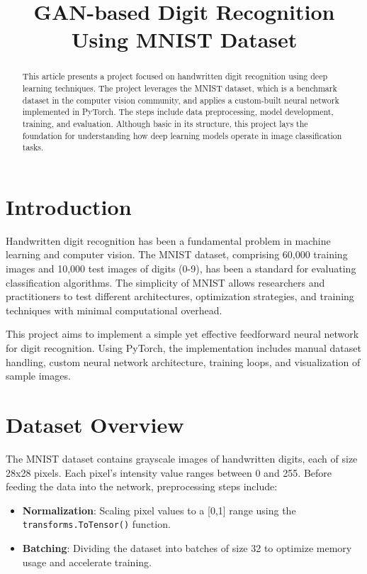 \documentclass{article}
\title{GAN-based Digit Recognition Using MNIST Dataset}
\author{}
\date{}
\begin{document}
\maketitle

\begin{abstract}
This article presents a project focused on handwritten digit recognition using deep learning techniques. The project leverages the MNIST dataset, which is a benchmark dataset in the computer vision community, and applies a custom-built neural network implemented in PyTorch. The steps include data preprocessing, model development, training, and evaluation. Although basic in its structure, this project lays the foundation for understanding how deep learning models operate in image classification tasks.
\end{abstract}

\section{Introduction}
Handwritten digit recognition has been a fundamental problem in machine learning and computer vision. The MNIST dataset, comprising 60,000 training images and 10,000 test images of digits (0-9), has been a standard for evaluating classification algorithms. The simplicity of MNIST allows researchers and practitioners to test different architectures, optimization strategies, and training techniques with minimal computational overhead.

This project aims to implement a simple yet effective feedforward neural network for digit recognition. Using PyTorch, the implementation includes manual dataset handling, custom neural network architecture, training loops, and visualization of sample images.

\section{Dataset Overview}
The MNIST dataset contains grayscale images of handwritten digits, each of size 28x28 pixels. Each pixel's intensity value ranges between 0 and 255. Before feeding the data into the network, preprocessing steps include:
\begin{itemize}
    \item \textbf{Normalization}: Scaling pixel values to a [0,1] range using the \texttt{transforms.ToTensor()} function.
    \item \textbf{Batching}: Dividing the dataset into batches of size 32 to optimize memory usage and accelerate training.
\end{itemize}
\end{document}
